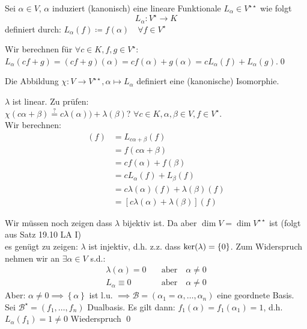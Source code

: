 \begin{subproposition}
	Sei $ \alpha \in V $, $ \alpha $ induziert (kanonisch) eine lineare Funktionale $ L_\alpha \in V^{\star \star }  $ wie folgt
	\[
		L_{\alpha} : V^\star \to K
	\]
	definiert durch: $ L_{\alpha} (f) \coloneqq f(\alpha) \quad \forall f \in V^\star $ 
\end{subproposition}

\begin{subproof*}
	Wir berechnen für $ \forall c \in K, f, g \in V^\star  $:\\
	$ L_{\alpha} (cf + g) = (cf + g)(\alpha) = cf(\alpha) + g(\alpha) = c L_{\alpha} (f) + L_{\alpha} (g) $.\qed
\end{subproof*}

\begin{subtheorem}
	Die Abbildung $ \chi : V \to V^{\star \star } , \alpha \mapsto L_{\alpha}  $ definiert eine (kanonische) Isomorphie.
\end{subtheorem}

\begin{subproof*}
	$ \lambda $ ist linear. Zu prüfen:\\
	$ \chi(c\alpha + \beta) \overset{?}{=} c\lambda(\alpha)) + \lambda(\beta) $? $ \forall c \in K, \alpha, \beta \in V, f \in V^\star  $.\\
	Wir berechnen:
	\begin{align*}
		[\lambda(c\alpha + \beta)](f) &= L_{c\alpha + \beta} (f) \\
		~&= f(c\alpha + \beta) \\
		~&= cf(\alpha) + f(\beta) \\
		~&= cL_{\alpha} (f) + L_{\beta} (f) \\
		~&= c\lambda(\alpha)(f) + \lambda(\beta)(f) \\
		~&= [c\lambda(\alpha) + \lambda(\beta)](f)
	\end{align*}
	
	Wir müssen noch zeigen dass $ \lambda $ bijektiv ist. Da aber $ \dim V = \dim V^{\star \star }  $ ist (folgt aus Satz 19.10 LA I)\\
	es genügt zu zeigen: $ \lambda $ ist injektiv, d.h. z.z. dass $ \operatorname{ker}(\lambda) = \left\{ 0 \right\}  $. Zum Widerspruch nehmen wir an $ \exists \alpha \in V $ s.d.:
	\begin{align*}
		\lambda(\alpha) = 0 \quad &\text{aber} \quad \alpha \neq 0 \\
		L_\alpha \equiv 0 \quad &\text{aber} \quad \alpha \neq 0 
	\end{align*}
	Aber: $ \alpha \neq 0 \implies \left\{ \alpha \right\}  $ ist l.u. $ \implies \mathcal{B} = (\alpha_1 = \alpha, \dotsc, \alpha_n) $ eine geordnete Basis. Sei $ \mathcal{B}^\star  = (f_1, \dotsc, f_n) $ Dualbasis. Es gilt dann: $ f_1(\alpha) = f_1(\alpha_1) = 1 $, d.h. $ L_{\alpha} (f_1) = 1 \neq 0 $ Wiederspruch \qed
\end{subproof*}

